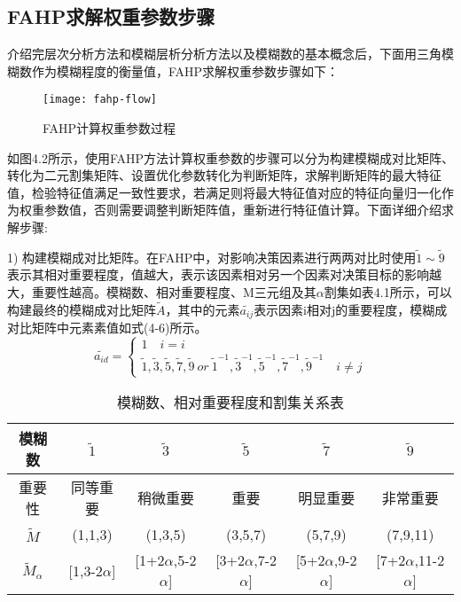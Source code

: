 \subsection{FAHP求解权重参数步骤}
介绍完层次分析方法和模糊层析分析方法以及模糊数的基本概念后，下面用三角模糊数作为模糊程度的衡量值，FAHP求解权重参数步骤如下：
\begin{figure}[H] %
	\centering
	\texttt{[image: fahp-flow]}
	\caption{FAHP计算权重参数过程}
\end{figure}
如图4.2所示，使用FAHP方法计算权重参数的步骤可以分为构建模糊成对比矩阵、转化为二元割集矩阵、设置优化参数转化为判断矩阵，求解判断矩阵的最大特征值，检验特征值满足一致性要求，若满足则将最大特征值对应的特征向量归一化作为权重参数值，否则需要调整判断矩阵值，重新进行特征值计算。下面详细介绍求解步骤:

1) 构建模糊成对比矩阵。在FAHP中，对影响决策因素进行两两对比时使用\begin{math}\widetilde{1}\sim \widetilde{9}\end{math}表示其相对重要程度，值越大，表示该因素相对另一个因素对决策目标的影响越大，重要性越高。模糊数、相对重要程度、M三元组及其\begin{math}\alpha \end{math}割集如表4.1所示，可以构建最终的模糊成对比矩阵\begin{math}\widetilde{A} \end{math}，其中的元素\begin{math}\widetilde{a_{ij}} \end{math}表示因素i相对j的重要程度，模糊成对比矩阵中元素素值如式(4-6)所示。
\begin{equation}
\widetilde{a_{id}} = \left\{\begin{array}{l}
1 \quad i=i \\ [0.2cm]
\widetilde{1},\widetilde{3},\widetilde{5},\widetilde{7},\widetilde{9}\ or\ \widetilde{1}^{-1},\widetilde{3}^{-1},\widetilde{5}^{-1},\widetilde{7}^{-1},\widetilde{9}^{-1} \quad i\not=j  
\end{array}\right.
\end{equation}
\begin{table}[htbp]
	\centering\dawu[1.3]
	\caption{模糊数、相对重要程度和割集关系表}
	\begin{tabular}{|c|c|c|c|c|c|} \hline
		模糊数 & $\widetilde{1}$ & $\widetilde{3}$ & $\widetilde{5}$  & $\widetilde{7}$ & $\widetilde{9}$ \\ \hline
		重要性 & 同等重要 & 稍微重要 & 重要 & 明显重要 & 非常重要 \\ \hline 
		$\widetilde{M}$ & (1,1,3) & (1,3,5) & (3,5,7) & (5,7,9) & (7,9,11) \\ \hline 
		$\widetilde{M}_{\alpha}$ & [1,3-2$\alpha$] & [1+2$\alpha$,5-2$\alpha$] & [3+2$\alpha$,7-2$\alpha$] & [5+2$\alpha$,9-2$\alpha$] & [7+2$\alpha$,11-2$\alpha$]\\ \hline 
	\end{tabular}
\end{table}

